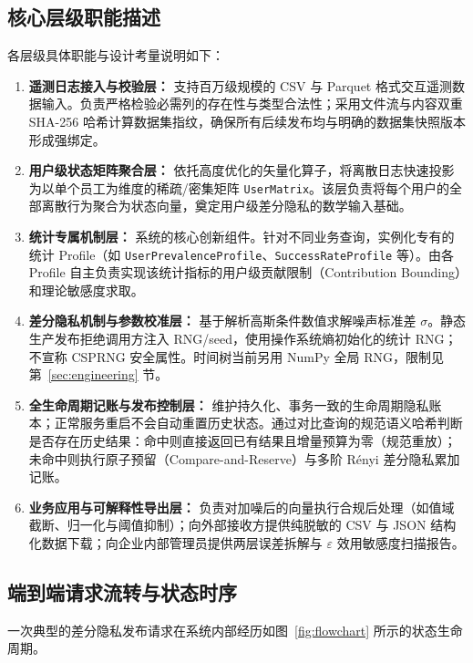\subsection{核心层级职能描述}
各层级具体职能与设计考量说明如下：
\begin{enumerate}[label=\textbf{\arabic*.}, leftmargin=2em]
  \item \textbf{遥测日志接入与校验层：} 支持百万级规模的 CSV 与 Parquet 格式交互遥测数据输入。负责严格检验必需列的存在性与类型合法性；采用文件流与内容双重 SHA-256 哈希计算数据集指纹，确保所有后续发布均与明确的数据集快照版本形成强绑定。
  \item \textbf{用户级状态矩阵聚合层：} 依托高度优化的矢量化算子，将离散日志快速投影为以单个员工为维度的稀疏/密集矩阵 \texttt{UserMatrix}。该层负责将每个用户的全部离散行为聚合为状态向量，奠定用户级差分隐私的数学输入基础。
  \item \textbf{统计专属机制层：} 系统的核心创新组件。针对不同业务查询，实例化专有的统计 Profile（如 \texttt{UserPrevalenceProfile}、\texttt{SuccessRateProfile} 等）。由各 Profile 自主负责实现该统计指标的用户级贡献限制（Contribution Bounding）和理论敏感度求取。
  \item \textbf{差分隐私机制与参数校准层：} 基于解析高斯条件数值求解噪声标准差 $\sigma$。静态生产发布拒绝调用方注入 RNG/seed，使用操作系统熵初始化的统计 RNG；不宣称 CSPRNG 安全属性。时间树当前另用 NumPy 全局 RNG，限制见第~\ref{sec:engineering} 节。
  \item \textbf{全生命周期记账与发布控制层：} 维护持久化、事务一致的生命周期隐私账本；正常服务重启不会自动重置历史状态。通过对比查询的规范语义哈希判断是否存在历史结果：命中则直接返回已有结果且增量预算为零（规范重放）；未命中则执行原子预留（Compare-and-Reserve）与多阶 Rényi 差分隐私累加记账。
  \item \textbf{业务应用与可解释性导出层：} 负责对加噪后的向量执行合规后处理（如值域截断、归一化与阈值抑制）；向外部接收方提供纯脱敏的 CSV 与 JSON 结构化数据下载；向企业内部管理员提供两层误差拆解与 $\varepsilon$ 效用敏感度扫描报告。
\end{enumerate}

\subsection{端到端请求流转与状态时序}
一次典型的差分隐私发布请求在系统内部经历如图~\ref{fig:flowchart} 所示的状态生命周期。

